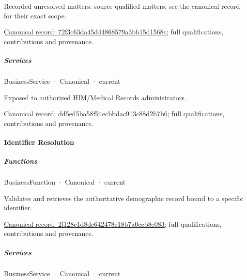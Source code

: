 {\small Recorded unresolved matters: source-qualified matters; see the canonical record for their exact scope.}\par
{\footnotesize \href{../../../../continuum/business/business-process/72f3c63da45d44868579a3bb15d1568c.md}{Canonical record: 72f3c63da45d44868579a3bb15d1568c}; full qualifications, contributions and provenance.}\par
\subparagraph{Services}



\label{element:dd5ed5ba58f94ecbbdac913c88d2b7b6}
{\small BusinessService · Canonical · current}\par

Exposed to authorized HIM/Medical Records administrators.


{\footnotesize \href{../../../../continuum/business/business-service/dd5ed5ba58f94ecbbdac913c88d2b7b6.md}{Canonical record: dd5ed5ba58f94ecbbdac913c88d2b7b6}; full qualifications, contributions and provenance.}\par
\paragraph{Identifier Resolution}

\subparagraph{Functions}



\label{element:2f128e1d8de642478c18b7a0ccb8e083}
{\small BusinessFunction · Canonical · current}\par

Validates and retrieves the authoritative demographic record bound to a specific identifier.


{\footnotesize \href{../../../../continuum/business/business-function/2f128e1d8de642478c18b7a0ccb8e083.md}{Canonical record: 2f128e1d8de642478c18b7a0ccb8e083}; full qualifications, contributions and provenance.}\par
\subparagraph{Services}



\label{element:a533cf0d23364f398f2a71843cce98c4}
{\small BusinessService · Canonical · current}\par

